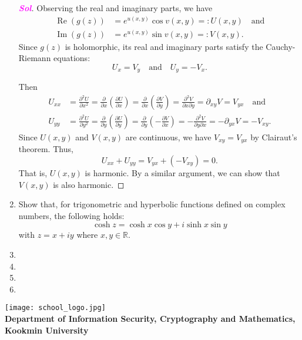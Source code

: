 \documentclass{article}
\newcommand{\footer}[1]{
\begin{flushright}
	\vspace{2em}
	\texttt{[image: school\_logo.jpg]} \\
	\vspace{1em}
	\textcolor{blue2}{\small\textbf{#1}}
\end{flushright}
}
\theoremstyle{definition}
\newcommand{\R}{\mathbb{R}}
\newcommand{\of}[1]{\left( #1 \right)}
\newcommand{\sol}{\textcolor{magenta}{\bf Sol}}
\renewcommand{\Re}{\operatorname{Re}}
\renewcommand{\Im}{\operatorname{Im}}
\begin{document}
\begin{enumerate}
\begin{proof}[\sol]
		Observing the real and imaginary parts, we have \begin{align*}
			\Re\of{g(z)}&=e^{u\of{x,y}}\cos v\of{x,y} =: U(x,y)\quad \text{and}\\
			\Im\of{g(z)}&=e^{u\of{x,y}}\sin v\of{x,y} =: V(x,y).
		\end{align*} Since $g(z)$ is holomorphic, its real and imaginary parts satisfy the Cauchy-Riemann equations: \[
		U_x=V_y\quad\text{and}\quad U_y=-V_x.
		\]
		
		Then \begin{align*}
			U_{xx}&=\frac{\partial^2U}{\partial x^2}=\frac{\partial}{\partial x}\of{\frac{\partial U}{\partial x}}=\frac{\partial}{\partial x}\of{\frac{\partial V}{\partial y}}=\frac{\partial^2V}{\partial x\partial y}=\partial_{xy}V=V_{yx}\quad\text{and}\\
			U_{yy}&=\frac{\partial^2U}{\partial y^2}=\frac{\partial}{\partial y}\of{\frac{\partial U}{\partial y}}=\frac{\partial}{\partial y}\of{-\frac{\partial V}{\partial x}}=-\frac{\partial^2V}{\partial y\partial x}=-\partial_{yx}V=-V_{xy}.
		\end{align*}
		Since $U(x,y)$ and $V(x,y)$ are continuous, we have $V_{xy}=V_{yx}$ by Clairaut's theorem. Thus, \[
		U_{xx}+U_{yy}=V_{yx}+(-V_{xy})=0.
		\] That is, $U(x,y)$ is harmonic. By a similar argument, we can show that $V(x, y)$ is also harmonic.
	\end{proof}
	
	\item Show that, for trigonometric and hyperbolic functions defined on complex numbers, the following holds: \[
	\cosh z = \cosh x\cos y+i\sinh x\sin y
	\]  with $z=x+iy$ where $x,y\in\R$.
	\item 
	\item 
	\item 
	\item 
\end{enumerate}


\footer{Department of Information Security, Cryptography and Mathematics, Kookmin University}
\end{document}
